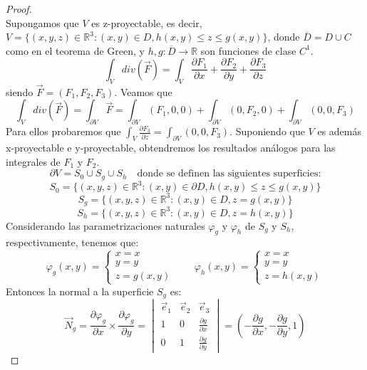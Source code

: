 \begin{proof}
    \underline{}\\
    Supongamos que $V$ es z-proyectable, es decir, $V = \{(x,y,z) \in \mathbb{R}^3 : (x,y) \in D, h(x,y) \leq z \leq g(x,y) \}$, donde $\overline{D} = D \cup C$ como en el teorema de Green, y $h,g : \overline{D} \to \mathbb{R}$ son funciones de clase $C^1$.
    $$\int_{V} div(\vec{F}) = \int_{V} \frac{\partial F_1}{\partial x} + \frac{\partial F_2}{\partial y} + \frac{\partial F_3}{\partial z}$$
    siendo $\vec{F} = (F_1,F_2,F_3)$.
    Veamos que 
    $$\int_{V} div(\vec{F}) = \int_{\partial V} \vec{F} = \int_{\partial V} (F_1,0,0) + \int_{\partial V} (0,F_2,0) + \int_{\partial V} (0,0,F_3)$$
    Para ellos probaremos que $\int_{V} \frac{\partial F_3}{\partial z} = \int_{\partial V} (0,0,F_3)$. Suponiendo que $V$ es además x-proyectable e y-proyectable, obtendremos los resultados análogos para las integrales de $F_1$ y $F_2$.\\
    $$\partial V = S_0 \cup S_g \cup S_h \quad \text{donde se definen las siguientes superficies:}$$
    $$S_0 = \{(x,y,z) \in \mathbb{R}^3 : (x,y) \in \partial D, h(x,y) \leq z \leq g(x,y) \}$$
    $$S_g = \{(x,y,z) \in \mathbb{R}^3 : (x,y) \in D, z = g(x,y)\}$$
    $$S_h = \{(x,y,z) \in \mathbb{R}^3 : (x,y) \in D, z = h(x,y)\}$$
    Considerando las parametrizaciones naturales $\varphi_g$ y $\varphi_h$ de $S_g$ y $S_h$, respectivamente, tenemos que:
    $$\varphi_g(x,y) = \begin{cases}
        x = x \\
        y = y \\
        z = g(x,y)
    \end{cases} \qquad \varphi_h(x,y) = \begin{cases}
        x = x \\
        y = y \\
        z = h(x,y)
    \end{cases}$$
    Entonces la normal a la superficie $S_g$ es:
    $$\vec{N}_g = \frac{\partial \varphi_g}{\partial x} \times \frac{\partial \varphi_g}{\partial y} = \begin{vmatrix}
        \vec{e}_1 & \vec{e}_2 & \vec{e}_3 \\
        1         & 0         & \frac{\partial g}{\partial x} \\
        0         & 1         & \frac{\partial g}{\partial y}
    \end{vmatrix} = \left( -\frac{\partial g}{\partial x}, -\frac{\partial g}{\partial y}, 1 \right)$$

\end{proof}
